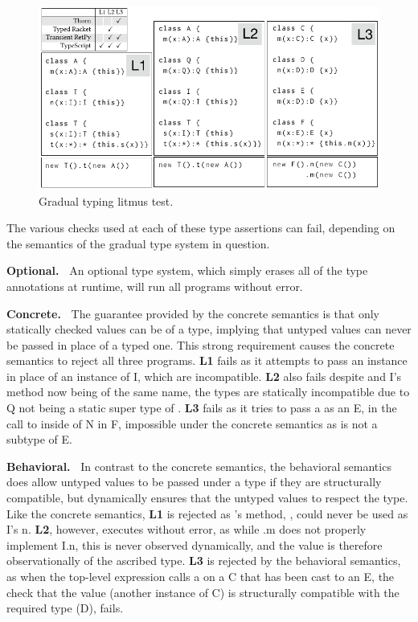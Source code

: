 \documentclass[USenglish]{tex/lipics-v2016}
\begin{document}
\begin{figure}[!h]
  \includegraphics[width=.95\columnwidth]{../figures/litm}
  \caption{Gradual typing litmus test.}\label{litmus}
\end{figure}

The various checks used at each of these type assertions can fail, depending
on the semantics of the gradual type system in question.

{\bf Optional.~} An optional type system, which simply erases all of the
type annotations at runtime, will run all programs without error.

{\bf Concrete.~} The guarantee provided by the concrete semantics is that
only statically checked values can be of a type, implying that untyped
values can never be passed in place of a typed one. This strong requirement
causes the concrete semantics to reject all three programs. {\bf L1} fails
as it attempts to pass an \A instance in place of an instance of \xt I,
which are incompatible.  {\bf L2} also fails despite \A and \xt I's
method now being of the same name, the types are statically incompatible due
to \xt Q not being a static super type of \A. {\bf L3} fails as it tries to
pass a \C as an \xt E, in the call to \m inside of \xt N in \xt F,
impossible under the concrete semantics as \C is not a subtype of \xt E.

{\bf Behavioral.~} In contrast to the concrete semantics, the behavioral
semantics does allow untyped values to be passed under a type if they are
structurally compatible, but dynamically ensures that the untyped values to
respect the type. Like the concrete semantics, {\bf L1} is rejected as \A's
method, \m, could never be used as \xt I's \xt n. {\bf L2}, however,
executes without error, as while \A.\xt m does not properly implement \xt
I.\xt n, this is never observed dynamically, and the value is therefore
observationally of the ascribed type. {\bf L3} is rejected by the behavioral
semantics, as when the top-level expression calls \xt a on a \xt C that has
been cast to an \xt E, the check that the value (another instance of \xt C)
is structurally compatible with the required type (\xt D), fails.
\end{document}

